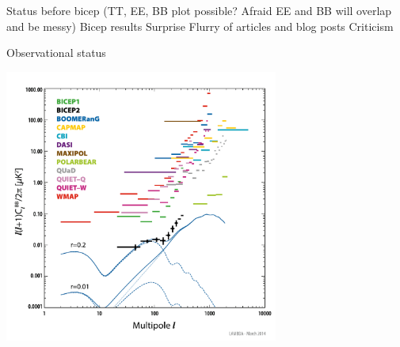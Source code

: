 \documentclass{beamer}
\begin{document}
Status before bicep (TT, EE, BB plot possible? Afraid EE and BB will overlap and be messy)
Bicep results
Surprise
Flurry of articles and blog posts
Criticism

\begin{frame}{Observational status}
	\begin{center}
		\vspace{-5mm}
		\includegraphics[height=9cm]{bb_limits_mar2014.pdf}
	\end{center}
\end{frame}
\end{document}
